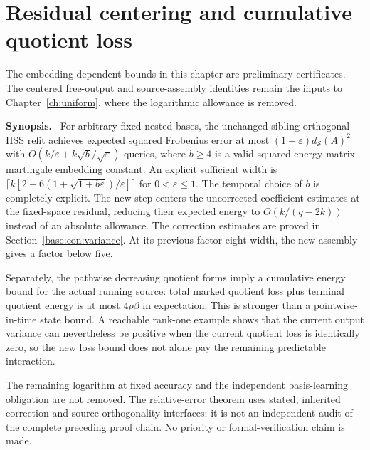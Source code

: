 \documentclass[11pt,oneside,openany,a4paper]{book}
\numberwithin{equation}{chapter}
\theoremstyle{definition}
\theoremstyle{remark}
\newenvironment{chaptersynopsis}{\begingroup\small\textbf{Synopsis.}\ }{\par\endgroup\medskip}
\begin{document}
\chapter{Residual centering and cumulative quotient loss}\label{ch:centered}
\begin{scopebox}
The embedding-dependent bounds in this chapter are preliminary certificates. The centered free-output and source-assembly identities remain the inputs to Chapter~\ref{ch:uniform}, where the logarithmic allowance is removed.
\end{scopebox}
\begin{chaptersynopsis}
For arbitrary fixed nested bases, the unchanged sibling-orthogonal HSS refit achieves expected squared Frobenius error at most $(1+\varepsilon)d_{\mathcal S}(A)^2$ with
$O(k/\varepsilon+k\sqrt b/\sqrt\varepsilon)$ queries, where $b\ge4$ is a valid squared-energy matrix martingale embedding constant. An explicit sufficient width is
$\lceil k[2+6(1+\sqrt{1+b\varepsilon})/\varepsilon]\rceil$ for $0<\varepsilon\le1$.
The temporal choice of $b$ is completely explicit. The new step centers the uncorrected coefficient estimates at the fixed-space residual, reducing their expected energy to $O(k/(q-2k))$ instead of an absolute allowance. The correction estimates are proved in Section~\ref{base:con:variance}. At its previous factor-eight width, the new assembly gives a factor below five.

Separately, the pathwise decreasing quotient forms imply a cumulative energy bound for the actual running source: total marked quotient loss plus terminal quotient energy is at most $4\rho\beta$ in expectation. This is stronger than a pointwise-in-time state bound. A reachable rank-one example shows that the current output variance can nevertheless be positive when the current quotient loss is identically zero, so the new loss bound does not alone pay the remaining predictable interaction.

The remaining logarithm at fixed accuracy and the independent basis-learning obligation are not removed. The relative-error theorem uses stated, inherited correction and source-orthogonality interfaces; it is not an independent audit of the complete preceding proof chain. No priority or formal-verification claim is made.
\end{chaptersynopsis}
\end{document}
